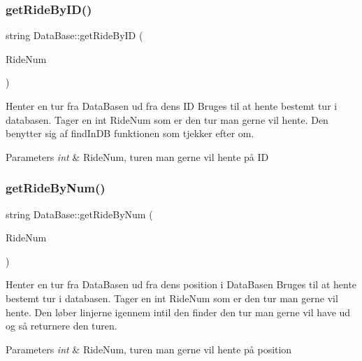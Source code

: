 \subsubsection{\texorpdfstring{get\+Ride\+By\+I\+D()}{getRideByID()}}
{\footnotesize\ttfamily string Data\+Base\+::get\+Ride\+By\+ID (\begin{DoxyParamCaption}\item[{int}]{Ride\+Num }\end{DoxyParamCaption})}



Henter en tur fra Data\+Basen ud fra dens ID Bruges til at hente bestemt tur i databasen. Tager en int Ride\+Num som er den tur man gerne vil hente. Den benytter sig af find\+In\+DB funktionen som tjekker efter om. 


\begin{DoxyParams}{Parameters}
{\em int} & Ride\+Num, turen man gerne vil hente på ID \\
\hline
\end{DoxyParams}
\mbox{\label{classDataBase_af54cca48be1b450a8b9bf9cc0267b2e1}} 
\subsubsection{\texorpdfstring{get\+Ride\+By\+Num()}{getRideByNum()}}
{\footnotesize\ttfamily string Data\+Base\+::get\+Ride\+By\+Num (\begin{DoxyParamCaption}\item[{int}]{Ride\+Num }\end{DoxyParamCaption})}



Henter en tur fra Data\+Basen ud fra dens position i Data\+Basen Bruges til at hente bestemt tur i databasen. Tager en int Ride\+Num som er den tur man gerne vil hente. Den løber linjerne igennem intil den finder den tur man gerne vil have ud og så returnere den turen. 


\begin{DoxyParams}{Parameters}
{\em int} & Ride\+Num, turen man gerne vil hente på position \\
\hline
\end{DoxyParams}
\mbox{\label{classDataBase_aaf94c591c9119fd3fa06fa90ebb56654}} 

